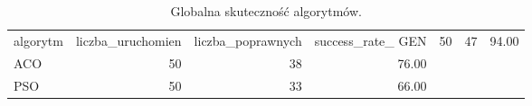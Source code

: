 \begin{table}
\caption{Globalna skuteczność algorytmów.}
\label{tab:success_rate}
\begin{tabular}{lrrr}
\toprule
algorytm & liczba_uruchomien & liczba_poprawnych & success_rate_%
\midrule
GEN & 50 & 47 & 94.00 \\
ACO & 50 & 38 & 76.00 \\
PSO & 50 & 33 & 66.00 \\
\bottomrule
\end{tabular}
\end{table}
